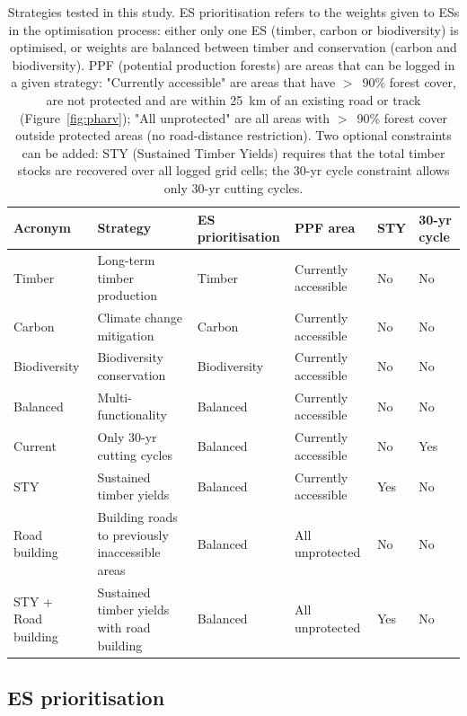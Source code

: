 \documentclass{article}
\begin{document}
\begin{table}
    \centering
    \begin{tabularx}{\textwidth}{p{2cm} p{4.5cm} p{2cm} p{3.5cm} p{0.8cm} p{1cm}}
    \toprule
         Acronym & Strategy & ES prioritisation & PPF area &  STY & 30-yr cycle \\
         \midrule
         Timber & Long-term timber production & Timber  & Currently accessible & No & No\\
         Carbon & Climate change mitigation &  Carbon & Currently accessible & No & No\\
         Biodiversity & Biodiversity conservation &  Biodiversity & Currently accessible & No & No \\
         Balanced & Multi-functionality & Balanced & Currently accessible & No & No \\
         Current & Only 30-yr cutting cycles & Balanced & Currently accessible & No & Yes \\
         STY & Sustained timber yields & Balanced & Currently accessible & Yes & No \\
         Road building & Building roads to previously inaccessible areas & Balanced & All unprotected & No & No \\
         STY + Road building & Sustained timber yields with road building & Balanced & All unprotected & Yes & No \\
         \bottomrule
    \end{tabularx}
    \caption{Strategies tested in this study. ES prioritisation refers to the weights given to ESs in the optimisation process: either only one ES (timber, carbon or biodiversity) is optimised, or weights are balanced between timber and conservation (carbon and biodiversity). PPF (potential production forests) are areas that can be logged in a given strategy: "Currently accessible" are areas that have $>$~90\% forest cover, are not protected and are within 25~km of an existing road or track (Figure~\ref{fig:pharv}); "All unprotected" are all areas with $>$~90\% forest cover outside protected areas (no road-distance restriction). Two optional constraints can be added: STY (Sustained Timber Yields) requires that the total timber stocks are recovered over all logged grid cells; the 30-yr cycle constraint allows only 30-yr cutting cycles.}
    \label{tab:strategies}
\end{table}

\subsection{ES prioritisation}
\end{document}
